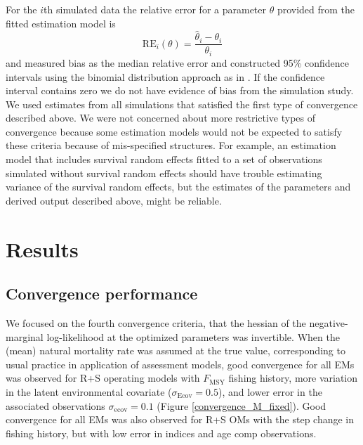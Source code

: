 \documentclass[
  12pt,
]{article}
\newcommand{\Fmsy}{\ensuremath{F_{\text{MSY}}}\xspace}
\begin{document}
For the \(i\)th simulated data the relative error for a parameter
\(\theta\) provided from the fitted estimation model is \[
{\text{RE}_i}\left(\theta\right) = \frac{\widehat \theta_i - \theta_i}{\theta_i}
\] and measured bias as the median relative error and constructed 95\%
confidence intervals using the binomial distribution approach as in
\citet{stockmiller21}. If the confidence interval contains zero we do
not have evidence of bias from the simulation study. We used estimates
from all simulations that satisfied the first type of convergence
described above. We were not concerned about more restrictive types of
convergence because some estimation models would not be expected to
satisfy these criteria because of mis-specified structures. For example,
an estimation model that includes survival random effects fitted to a
set of observations simulated without survival random effects should
have trouble estimating variance of the survival random effects, but the
estimates of the parameters and derived output described above, might be
reliable.

\hypertarget{results}{%
\section*{Results}\label{results}}

\hypertarget{convergence-performance}{%
\subsection*{Convergence performance}\label{convergence-performance}}

We focused on the fourth convergence criteria, that the hessian of the
negative-marginal log-likelihood at the optimized parameters was
invertible. When the (mean) natural mortality rate was assumed at the
true value, corresponding to usual practice in application of assessment
models, good convergence for all EMs was observed for R+S operating
models with \Fmsy fishing history, more variation in the latent
environmental covariate (\(\sigma_\text{Ecov} = 0.5\)), and lower error
in the associated observations \(\sigma_\text{ecov} = 0.1\) (Figure
\ref{convergence_M_fixed}). Good convergence for all EMs was also
observed for R+S OMs with the step change in fishing history, but with
low error in indices and age comp observations.
\end{document}
